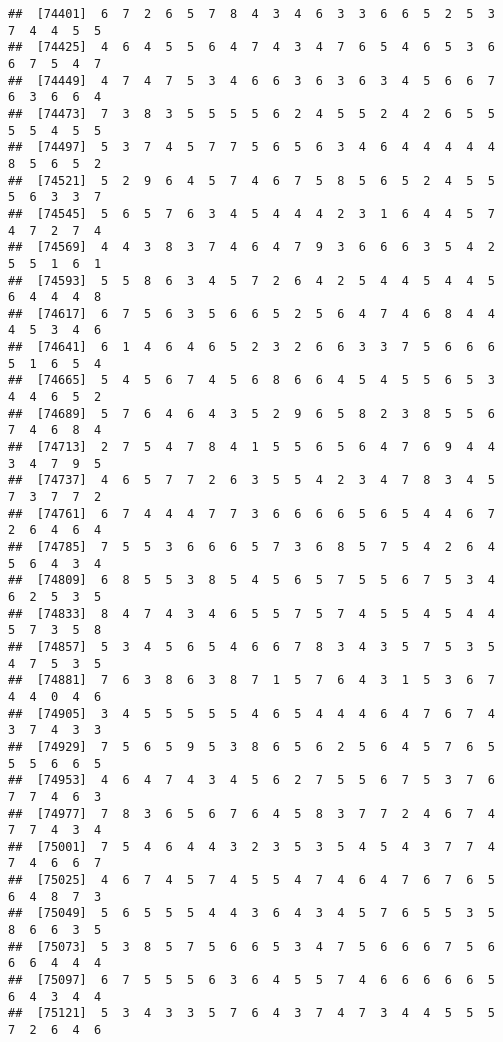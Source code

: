 \documentclass[
]{book}
\begin{document}
\begin{verbatim}
##  [74401]  6  7  2  6  5  7  8  4  3  4  6  3  3  6  6  5  2  5  3  7  4  4  5  5
##  [74425]  4  6  4  5  5  6  4  7  4  3  4  7  6  5  4  6  5  3  6  6  7  5  4  7
##  [74449]  4  7  4  7  5  3  4  6  6  3  6  3  6  3  4  5  6  6  7  6  3  6  6  4
##  [74473]  7  3  8  3  5  5  5  5  6  2  4  5  5  2  4  2  6  5  5  5  5  4  5  5
##  [74497]  5  3  7  4  5  7  7  5  6  5  6  3  4  6  4  4  4  4  4  8  5  6  5  2
##  [74521]  5  2  9  6  4  5  7  4  6  7  5  8  5  6  5  2  4  5  5  5  6  3  3  7
##  [74545]  5  6  5  7  6  3  4  5  4  4  4  2  3  1  6  4  4  5  7  4  7  2  7  4
##  [74569]  4  4  3  8  3  7  4  6  4  7  9  3  6  6  6  3  5  4  2  5  5  1  6  1
##  [74593]  5  5  8  6  3  4  5  7  2  6  4  2  5  4  4  5  4  4  5  6  4  4  4  8
##  [74617]  6  7  5  6  3  5  6  6  5  2  5  6  4  7  4  6  8  4  4  4  5  3  4  6
##  [74641]  6  1  4  6  4  6  5  2  3  2  6  6  3  3  7  5  6  6  6  5  1  6  5  4
##  [74665]  5  4  5  6  7  4  5  6  8  6  6  4  5  4  5  5  6  5  3  4  4  6  5  2
##  [74689]  5  7  6  4  6  4  3  5  2  9  6  5  8  2  3  8  5  5  6  7  4  6  8  4
##  [74713]  2  7  5  4  7  8  4  1  5  5  6  5  6  4  7  6  9  4  4  3  4  7  9  5
##  [74737]  4  6  5  7  7  2  6  3  5  5  4  2  3  4  7  8  3  4  5  7  3  7  7  2
##  [74761]  6  7  4  4  4  7  7  3  6  6  6  6  5  6  5  4  4  6  7  2  6  4  6  4
##  [74785]  7  5  5  3  6  6  6  5  7  3  6  8  5  7  5  4  2  6  4  5  6  4  3  4
##  [74809]  6  8  5  5  3  8  5  4  5  6  5  7  5  5  6  7  5  3  4  6  2  5  3  5
##  [74833]  8  4  7  4  3  4  6  5  5  7  5  7  4  5  5  4  5  4  4  5  7  3  5  8
##  [74857]  5  3  4  5  6  5  4  6  6  7  8  3  4  3  5  7  5  3  5  4  7  5  3  5
##  [74881]  7  6  3  8  6  3  8  7  1  5  7  6  4  3  1  5  3  6  7  4  4  0  4  6
##  [74905]  3  4  5  5  5  5  5  4  6  5  4  4  4  6  4  7  6  7  4  3  7  4  3  3
##  [74929]  7  5  6  5  9  5  3  8  6  5  6  2  5  6  4  5  7  6  5  5  5  6  6  5
##  [74953]  4  6  4  7  4  3  4  5  6  2  7  5  5  6  7  5  3  7  6  7  7  4  6  3
##  [74977]  7  8  3  6  5  6  7  6  4  5  8  3  7  7  2  4  6  7  4  7  7  4  3  4
##  [75001]  7  5  4  6  4  4  3  2  3  5  3  5  4  5  4  3  7  7  4  7  4  6  6  7
##  [75025]  4  6  7  4  5  7  4  5  5  4  7  4  6  4  7  6  7  6  5  6  4  8  7  3
##  [75049]  5  6  5  5  5  4  4  3  6  4  3  4  5  7  6  5  5  3  5  8  6  6  3  5
##  [75073]  5  3  8  5  7  5  6  6  5  3  4  7  5  6  6  6  7  5  6  6  6  4  4  4
##  [75097]  6  7  5  5  5  6  3  6  4  5  5  7  4  6  6  6  6  6  5  6  4  3  4  4
##  [75121]  5  3  4  3  3  5  7  6  4  3  7  4  7  3  4  4  5  5  5  7  2  6  4  6

\end{verbatim}
\end{document}

